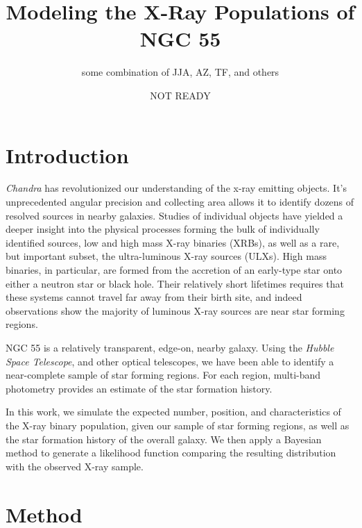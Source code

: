 \documentclass[12pt, preprint]{aastex}
\begin{document}
\title{Modeling the X-Ray Populations of NGC 55}
\author{some combination of JJA, AZ, TF, and others}
\date{NOT READY}

\begin{abstract}

\end{abstract}

\section{Introduction}

{\it Chandra} has revolutionized our understanding of the x-ray emitting objects. It's unprecedented angular precision and collecting area allows it to identify dozens of resolved sources in nearby galaxies. Studies of individual objects have yielded a deeper insight into the physical processes forming the bulk of individually identified sources, low and high mass X-ray binaries (XRBs), as well as a rare, but important subset, the ultra-luminous X-ray sources (ULXs). High mass binaries, in particular, are formed from the accretion of an early-type star onto either a neutron star or black hole. Their relatively short lifetimes requires that these systems cannot travel far away from their birth site, and indeed observations show the majority of luminous X-ray sources are near star forming regions. 

NGC 55 is a relatively transparent, edge-on, nearby galaxy. Using the {\it Hubble Space Telescope}, and other optical telescopes, we have been able to identify a near-complete sample of star forming regions. For each region, multi-band photometry provides an estimate of the star formation history. 

In this work, we simulate the expected number, position, and characteristics of the X-ray binary population, given our sample of star forming regions, as well as the star formation history of the overall galaxy. We then apply a Bayesian method to generate a likelihood function comparing the resulting distribution with the observed X-ray sample.

\section{Method}
\end{document}
